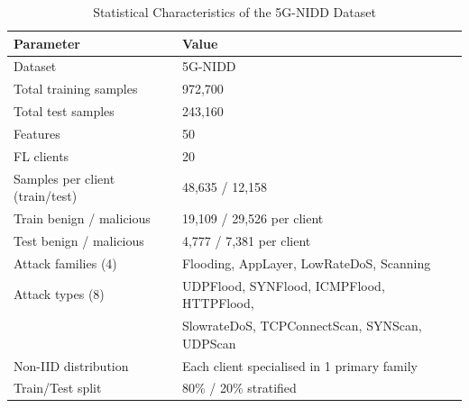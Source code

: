 \begin{table}[!t]
\renewcommand{\arraystretch}{1.2}
\caption{Statistical Characteristics of the 5G-NIDD Dataset}
\label{tab:dataset}
\centering
\begin{tabular}{ll}
\hline
\textbf{Parameter} & \textbf{Value} \\
\hline
Dataset & 5G-NIDD \\
Total training samples & 972,700 \\
Total test samples & 243,160 \\
Features & 50 \\
FL clients & 20 \\
Samples per client (train/test) & 48,635 / 12,158 \\
Train benign / malicious & 19,109 / 29,526 per client \\
Test benign / malicious & 4,777 / 7,381 per client \\
Attack families (4) & Flooding, AppLayer, LowRateDoS, Scanning \\
Attack types (8) & UDPFlood, SYNFlood, ICMPFlood, HTTPFlood, \\
                  & SlowrateDoS, TCPConnectScan, SYNScan, UDPScan \\
Non-IID distribution & Each client specialised in 1 primary family \\
Train/Test split & 80\% / 20\% stratified \\
\hline
\end{tabular}
\end{table}
